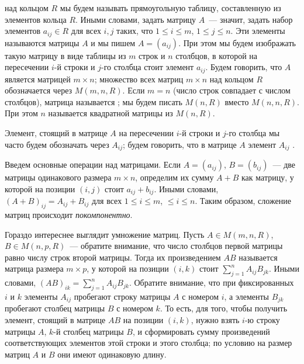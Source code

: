 \begin{definition}
 над кольцом $R$ мы будем называть
прямоугольную
таблицу, составленную из элементов кольца $R$. Иными словами, задать
матрицу $A$~--- значит, задать набор элементов $a_{ij}\in R$ для всех
$i,j$ таких, что $1\leq i\leq m$, $1\leq j\leq n$. Эти элементы
называются  матрицы
$A$ и мы пишем $A=(a_{ij})$.
При этом мы будем
изображать такую матрицу в виде таблицы из $m$ строк и $n$ столбцов, в
которой на пересечении $i$-й строки и $j$-го столбца стоит элемент
$a_{ij}$. Будем говорить, что $A$ является матрицей $m\times n$;
множество всех матриц $m\times n$ над кольцом $R$
обозначается через $M(m,n,R)$. Если
$m=n$ (число строк совпадает с числом столбцов), матрица называется
; мы будем писать $M(n,R)$
вместо $M(n,n,R)$. При этом $n$ называется
 квадратной матрицы
из $M(n,R)$.
\end{definition}

Элемент, стоящий в матрице $A$ на пересечении $i$-й строки и $j$-го
столбца мы часто будем обозначать через $A_{ij}$; будем говорить, что
в матрице $A$ элемент $A_{ij}$ .

Введем основные операции над матрицами. Если $A=(a_{ij})$,
$B=(b_{ij})$~--- две матрицы одинакового размера $m\times n$, определим их сумму
$A+B$ как матрицу, у которой на позиции $(i,j)$ стоит $a_{ij}+b_{ij}$.
Иными словами, $(A+B)_{ij}=A_{ij}+B_{ij}$ для всех $1\leq i\leq m$,
$\leq i\leq n$.
Таким образом, сложение матриц происходит {\it покомпонентно}.

Гораздо интереснее выглядит умножение матриц.
Пусть $A\in M(m,n,R)$, $B\in M(n,p,R)$~--- обратите внимание, что
число столбцов первой матрицы равно числу строк второй матрицы.
Тогда их произведением $AB$ называется матрица размера $m\times p$, у
которой на позиции $(i,k)$ стоит $\sum_{j=1}^nA_{ij}B_{jk}$. Иными
словами, $(AB)_{ik}=\sum_{j=1}^nA_{ij}B_{jk}$. Обратите внимание, что
при фиксированных $i$ и $k$ элементы $A_{ij}$ пробегают строку матрицы
$A$ с номером $i$, а элементы $B_{jk}$ пробегают столбец матрицы $B$ с
номером $k$. То есть, для того, чтобы получить элемент, стоящий в
матрице $AB$ на позиции $(i,k)$, нужно взять $i$-ю строку матрицы $A$,
$k$-й столбец матрицы $B$, и сформировать сумму произведений
соответствующих элементов этой строки и этого столбца; по условию на
размер матриц $A$ и $B$ они имеют одинаковую длину.


